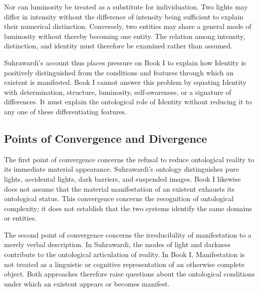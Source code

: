 \label{para:VS.B01.P01.C08.S14.SS15.P003}

Nor can luminosity be treated as
a substitute for individuation.
Two lights may differ in intensity
without the difference of intensity
being sufficient to explain
their numerical distinction.
Conversely, two entities may
share a general mode of luminosity
without thereby becoming one
entity. The relation among
intensity, distinction, and
identity must therefore be
examined rather than assumed.

\label{para:VS.B01.P01.C08.S14.SS15.P004}

Suhrawardi's account thus places
pressure on Book I to explain
how Identity is positively
distinguished from the conditions
and features through which
an existent is manifested.
Book I cannot answer this
problem by equating Identity
with determination, structure,
luminosity, self-awareness,
or a signature of differences.
It must explain the ontological
role of Identity without
reducing it to any one of
these differentiating features.


\subsection{Points of Convergence and Divergence}
\label{sec:ch08-s14-ss16}

\label{para:VS.B01.P01.C08.S14.SS16.P001}

The first point of convergence concerns
the refusal to reduce ontological
reality to its immediate material
appearance. Suhrawardi's ontology
distinguishes pure lights, accidental
lights, dark barriers, and suspended
images. Book I likewise does not
assume that the material manifestation
of an existent exhausts its ontological
status. This convergence concerns
the recognition of ontological
complexity; it does not establish
that the two systems identify
the same domains or entities.

\label{para:VS.B01.P01.C08.S14.SS16.P002}

The second point of convergence concerns
the irreducibility of manifestation
to a merely verbal description.
In Suhrawardi, the modes of light
and darkness contribute to the
ontological articulation of reality.
In Book I, Manifestation is
not treated as a linguistic
or cognitive representation
of an otherwise complete object.
Both approaches therefore
raise questions about the
ontological conditions under
which an existent appears
or becomes manifest.

